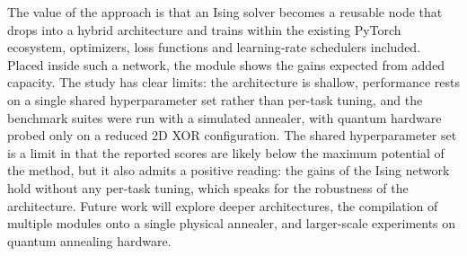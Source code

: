 \documentclass{ieeeaccess}
\begin{document}
The value of the approach is that an Ising solver becomes a reusable node that
drops into a hybrid architecture and trains within the existing PyTorch
ecosystem, optimizers, loss functions and learning-rate schedulers included.
Placed inside such a network, the module shows the gains expected from added
capacity.
The study has clear
limits: the architecture is shallow, performance rests on a single shared
hyperparameter set rather than per-task tuning, and the benchmark suites were
run with a simulated annealer, with quantum hardware probed only on a reduced
2D XOR configuration. The shared hyperparameter set is a limit in that the
reported scores are likely below the maximum potential of the method, but it
also admits a positive reading: the gains of the Ising network hold without
any per-task tuning, which speaks for the robustness of the architecture.
Future work will explore deeper architectures, the
compilation of multiple modules onto a single physical annealer, and
larger-scale experiments on quantum annealing hardware.



\EOD
\end{document}
